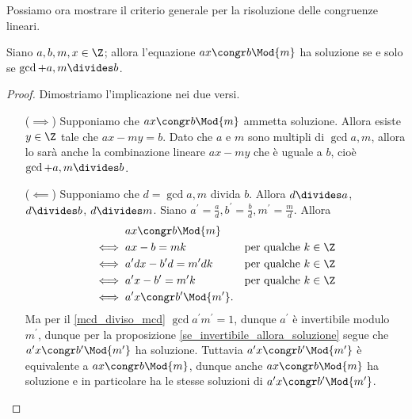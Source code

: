 Possiamo ora mostrare il criterio generale per la risoluzione delle congruenze lineari.

\begin{proposition} \label{cong_ha_soluzione_sse_mcd_div_b}
    Siano $a, b, m, x \in \Z$; allora l'equazione $ax \congr b \Mod{m}$ ha soluzione se e solo se $\gcd{a, m} \divides b$.
\end{proposition}
\begin{proof}
    Dimostriamo l'implicazione nei due versi.
    \begin{itemize}
        \item[($\implies$)] Supponiamo che $ax \congr b \Mod{m}$ ammetta soluzione. Allora esiste $y \in \Z$ tale che $ax - my = b$. Dato che $a$ e $m$ sono multipli di $\gcd{a, m}$, allora lo sarà anche la combinazione lineare $ax - my$ che è uguale a $b$, cioè $\gcd{a, m} \divides b$.
        \item[($\impliedby$)] Supponiamo che $d = \gcd{a, m}$ divida $b$. Allora $d\divides a$, $d \divides b$, $d \divides m$. Siano $a^\prime = \frac{a}{d}, b^\prime = \frac{b}{d}, m^\prime = \frac{m}{d}$. Allora 
        \begin{align*}
            &ax \congr b \Mod{m}\\
            \iff{} &ax - b = mk   &\text{per qualche $k \in \Z$} \\
            \iff{} &a^\prime dx - b^\prime d = m^\prime dk &\text{per qualche $k \in \Z$} \\
            \iff{} &a^\prime x - b^\prime = m^\prime k &\text{per qualche $k \in \Z$} \\
            \iff{} &a^\prime x \congr b^\prime \Mod{m^\prime }.
        \end{align*}
        Ma per il \autoref{mcd_diviso_mcd} $\gcd{a^\prime}{m^\prime} = 1$, dunque $a^\prime$ è invertibile modulo $m^\prime$, dunque per la proposizione \ref{se_invertibile_allora_soluzione} segue che $a^\prime x \congr b^\prime \Mod{m^\prime}$ ha soluzione. Tuttavia $a^\prime x \congr b^\prime \Mod{m^\prime}$ è equivalente a $ax \congr b \Mod{m}$, dunque anche $ax \congr b \Mod{m}$ ha soluzione e in particolare ha le stesse soluzioni di $a^\prime x \congr b^\prime \Mod{m^\prime}$. \qedhere
    \end{itemize}
\end{proof}

